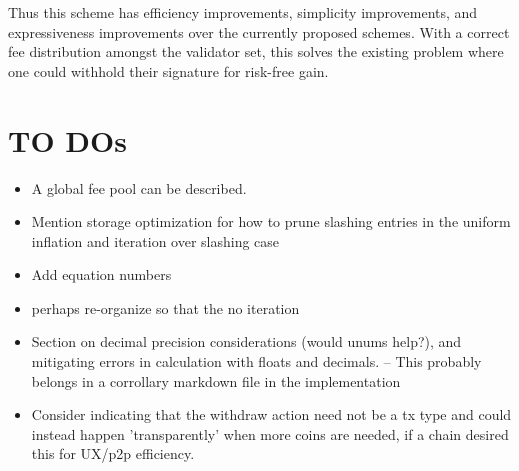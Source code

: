 \documentclass[]{article}
\begin{document}
Thus this scheme has efficiency improvements, simplicity improvements, and expressiveness improvements over the currently proposed schemes. With a correct fee distribution amongst the validator set, this solves the existing problem where one could withhold their signature for risk-free gain.

\section{TO DOs}

\begin{itemize}
	\item A global fee pool can be described.
	\item Mention storage optimization for how to prune slashing entries in the uniform inflation and iteration over slashing case
	\item Add equation numbers
	\item perhaps re-organize so that the no iteration
 	\item Section on decimal precision considerations (would unums help?), and mitigating errors in calculation with floats and decimals. -- This probably belongs in a corrollary markdown file in the implementation
 	\item Consider indicating that the withdraw action need not be a tx type and could instead happen 'transparently' when more coins are needed, if a chain desired this for UX/p2p efficiency.
\end{itemize}
\end{document}
